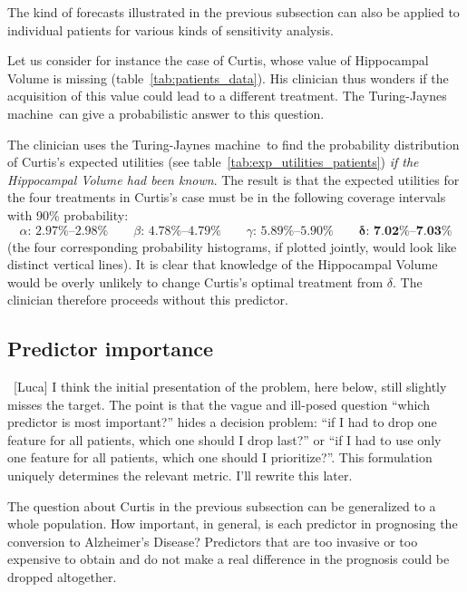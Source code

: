 \documentclass[utf8]{FrontiersinHarvard} %
\newcommand*{\wrench}{{\fontencoding{U}\fontfamily{fontawesomethree}\selectfont\symbol{114}}}
\newcommand{\mynotew}[1]{{\color{notecolour}\wrench\ #1}}
\renewcommand*{\|}[1][]{\nonscript\:#1\vert\nonscript\:\mathopen{}}
\newcommand*{\ad}{Alzheimer's Disease}
\newcommand*{\tjm}{Turing-Jaynes machine}
\begin{document}
The kind of forecasts illustrated in the previous subsection can also be applied to individual patients for various kinds of sensitivity analysis.

Let us consider for instance the case of Curtis, whose value of Hippocampal Volume is missing (table~\ref{tab:patients_data}). His clinician thus wonders if the acquisition of this value could lead to a different treatment. The \tjm\ can give a probabilistic answer to this question.

The clinician uses the \tjm\ to find the probability distribution of Curtis's expected utilities (see table~\ref{tab:exp_utilities_patients}) \emph{if the Hippocampal Volume had been known}. The result is that the expected utilities for the four treatments in Curtis's case must be in the following coverage intervals with 90\% probability:
\begin{equation}
  \label{eq:possible_utilities_curtis}
  \alpha\text{: 2.97\%--2.98\%}\qquad
  \beta\text{: 4.78\%--4.79\%}\qquad
  \gamma\text{: 5.89\%--5.90\%}\qquad
  \bm{\delta}\textbf{: 7.02\%--7.03\%}
\end{equation}
(the four corresponding probability histograms, if plotted jointly, would look like distinct vertical lines). It is clear that knowledge of the Hippocampal Volume would be overly unlikely to change Curtis's optimal treatment from $\delta$. The clinician therefore proceeds without this predictor.


\subsection{Predictor importance}
\label{sec:predictor_importance}

\mynotew{[Luca] I think the initial presentation of the problem, here below, still slightly misses the target. The point is that the vague and ill-posed question \enquote{which predictor is most important?} hides a decision problem: \enquote{if I had to drop one feature for all patients, which one should I drop last?} or \enquote{if I had to use only one feature for all patients, which one should I prioritize?}. This formulation uniquely determines the relevant metric. I'll rewrite this later.}

The question about Curtis in the previous subsection can be generalized to a whole population. How important, in general, is each predictor in prognosing the conversion to \ad? Predictors that are too invasive or too expensive to obtain and do not make a real difference in the prognosis could be dropped altogether.
\end{document}
